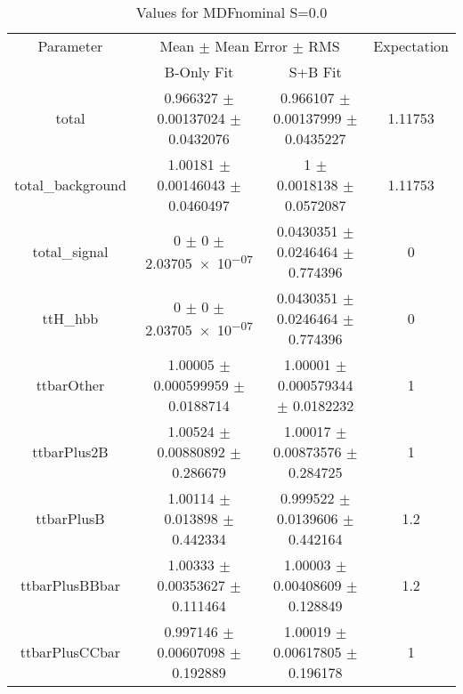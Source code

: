 \begin{table}
\centering
\caption{Values for MDFnominal S=0.0}
\begin{tabular}{cccc}
\toprule
Parameter & \multicolumn{2}{c}{Mean $\pm$ Mean Error $\pm$ RMS} & Expectation\\
 & B-Only Fit & S+B Fit & \\
\midrule
total & \num{0.966327} $\pm$ \num{0.00137024} $\pm$ \num{0.0432076} & \num{0.966107} $\pm$ \num{0.00137999} $\pm$ \num{0.0435227} & \num{1.11753}\\
total\_background & \num{1.00181} $\pm$ \num{0.00146043} $\pm$ \num{0.0460497} & \num{1} $\pm$ \num{0.0018138} $\pm$ \num{0.0572087} & \num{1.11753}\\
total\_signal & \num{0} $\pm$ \num{0} $\pm$ \num{2.03705e-07} & \num{0.0430351} $\pm$ \num{0.0246464} $\pm$ \num{0.774396} & \num{0}\\
ttH\_hbb & \num{0} $\pm$ \num{0} $\pm$ \num{2.03705e-07} & \num{0.0430351} $\pm$ \num{0.0246464} $\pm$ \num{0.774396} & \num{0}\\
ttbarOther & \num{1.00005} $\pm$ \num{0.000599959} $\pm$ \num{0.0188714} & \num{1.00001} $\pm$ \num{0.000579344} $\pm$ \num{0.0182232} & \num{1}\\
ttbarPlus2B & \num{1.00524} $\pm$ \num{0.00880892} $\pm$ \num{0.286679} & \num{1.00017} $\pm$ \num{0.00873576} $\pm$ \num{0.284725} & \num{1}\\
ttbarPlusB & \num{1.00114} $\pm$ \num{0.013898} $\pm$ \num{0.442334} & \num{0.999522} $\pm$ \num{0.0139606} $\pm$ \num{0.442164} & \num{1.2}\\
ttbarPlusBBbar & \num{1.00333} $\pm$ \num{0.00353627} $\pm$ \num{0.111464} & \num{1.00003} $\pm$ \num{0.00408609} $\pm$ \num{0.128849} & \num{1.2}\\
ttbarPlusCCbar & \num{0.997146} $\pm$ \num{0.00607098} $\pm$ \num{0.192889} & \num{1.00019} $\pm$ \num{0.00617805} $\pm$ \num{0.196178} & \num{1}\\
\bottomrule
\end{tabular}
\end{table}